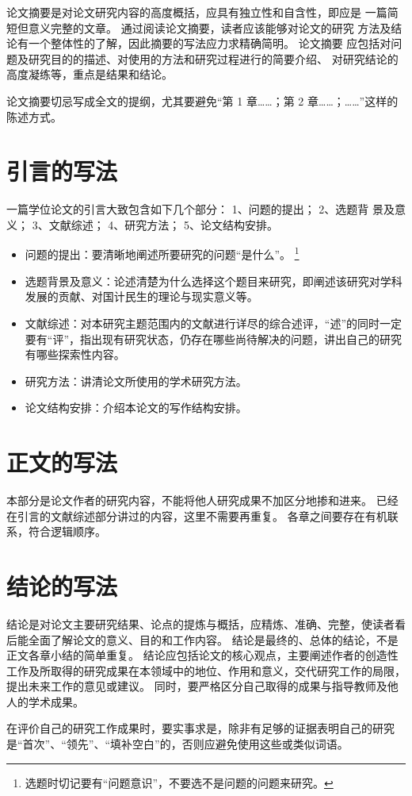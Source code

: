论文摘要是对论文研究内容的高度概括，应具有独立性和自含性，即应是 一篇简短但意义完整的文章。
通过阅读论文摘要，读者应该能够对论文的研究 方法及结论有一个整体性的了解，因此摘要的写法应力求精确简明。
论文摘要 应包括对问题及研究目的的描述、对使用的方法和研究过程进行的简要介绍、 对研究结论的高度凝练等，重点是结果和结论。

论文摘要切忌写成全文的提纲，尤其要避免“第 1 章……；第 2 章……；……”这样的陈述方式。



\section{引言的写法}

一篇学位论文的引言大致包含如下几个部分：
1、问题的提出；
2、选题背 景及意义；
3、文献综述；
4、研究方法；
5、论文结构安排。
\begin{itemize}
  \item 问题的提出：要清晰地阐述所要研究的问题“是什么”。
    \footnote{选题时切记要有“问题意识”，不要选不是问题的问题来研究。}
  \item 选题背景及意义：论述清楚为什么选择这个题目来研究，即阐述该研究对学科发展的贡献、对国计民生的理论与现实意义等。
  \item 文献综述：对本研究主题范围内的文献进行详尽的综合述评，“述”的同时一定要有“评”，指出现有研究状态，仍存在哪些尚待解决的问题，讲出自己的研究有哪些探索性内容。
  \item 研究方法：讲清论文所使用的学术研究方法。
  \item 论文结构安排：介绍本论文的写作结构安排。
\end{itemize}



\section{正文的写法}

本部分是论文作者的研究内容，不能将他人研究成果不加区分地掺和进来。
已经在引言的文献综述部分讲过的内容，这里不需要再重复。
各章之间要存在有机联系，符合逻辑顺序。



\section{结论的写法}

结论是对论文主要研究结果、论点的提炼与概括，应精炼、准确、完整，使读者看后能全面了解论文的意义、目的和工作内容。
结论是最终的、总体的结论，不是正文各章小结的简单重复。
结论应包括论文的核心观点，主要阐述作者的创造性工作及所取得的研究成果在本领域中的地位、作用和意义，交代研究工作的局限，提出未来工作的意见或建议。
同时，要严格区分自己取得的成果与指导教师及他人的学术成果。

在评价自己的研究工作成果时，要实事求是，除非有足够的证据表明自己的研究是“首次”、“领先”、“填补空白”的，否则应避免使用这些或类似词语。
